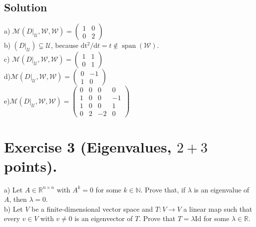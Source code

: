 \documentclass[10pt]{article}
\numberwithin{equation}{section}
\begin{document}
\subsection{Solution}
a) $\mathcal{M}\left(\left.D\right|_{\mathcal{U}}, \mathcal{W}, \mathcal{W}\right) = \begin{pmatrix}
	1 & 0 \\
	0 & 2
\end{pmatrix}$\\
b) $\left(\left.D\right|_{\mathcal{U}}\right) \subsetneq \mathcal{U}$, because $\mathrm{dt^2} / \mathrm{d} t = t \notin \operatorname{span}(\mathcal{W}).$\\
c) $\mathcal{M}\left(\left.D\right|_{\mathcal{U}}, \mathcal{W}, \mathcal{W}\right) = \begin{pmatrix}
	1 & 1 \\
	0 & 1
\end{pmatrix}$\\
d)$\mathcal{M}\left(\left.D\right|_{\mathcal{U}}, \mathcal{W}, \mathcal{W}\right) = \begin{pmatrix}
	0 & -1 \\
	1 & 0
\end{pmatrix}$\\
e)$\mathcal{M}\left(\left.D\right|_{\mathcal{U}}, \mathcal{W}, \mathcal{W}\right) = \begin{pmatrix}
	0  & 0 & 0 & 0 \\
	1 & 0 & 0 & -1 \\
	1 & 0 & 0 & 1  \\
	0 & 2 & -2 & 0
\end{pmatrix}$\\

\section{Exercise 3 (Eigenvalues, $2+3$ points).}
a) Let $A \in \mathbb{R}^{n \times n}$ with $A^k=0$ for some $k \in \mathbb{N}$. Prove that, if $\lambda$ is an eigenvalue of $A$, then $\lambda=0$.\\
b) Let $V$ be a finite-dimensional vector space and $T: V \rightarrow V$ a linear map such that every $v \in V$ with $v \neq 0$ is an eigenvector of $T$. Prove that $T=\lambda \mathrm{Id}$ for some $\lambda \in \mathbb{R}$.\\ 
\end{document}
